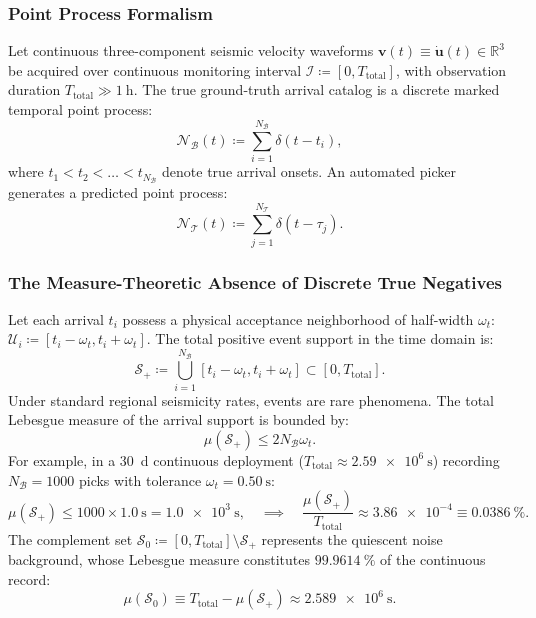 \subsubsection*{Point Process Formalism}
Let continuous three-component seismic velocity waveforms
$\mathbf{v}(t) \equiv \dot{\mathbf{u}}(t) \in \mathbb{R}^3$
be acquired over continuous monitoring interval $\mathcal{I}
\coloneqq [0, T_{\mathrm{total}}]$,
with observation duration $T_{\mathrm{total}} \gg \qty{1}{\hour}$.
The true ground-truth arrival catalog is a discrete marked temporal
point process:
\begin{equation}
  \mathcal{N}_{\mathcal{B}}(t) \coloneqq
  \sum_{i=1}^{N_{\mathcal{B}}} \delta(t - t_i),
  \label{eq:supp_bulletin_process}
\end{equation}
where $t_1 < t_2 < \dots < t_{N_{\mathcal{B}}}$ denote true arrival onsets.
An automated picker generates a predicted point process:
\begin{equation}
  \mathcal{N}_{\mathcal{T}}(t) \coloneqq
  \sum_{j=1}^{N_{\mathcal{T}}} \delta(t - \tau_j).
  \label{eq:supp_target_process}
\end{equation}

\subsubsection*{The Measure-Theoretic Absence of Discrete True Negatives}
Let each arrival $t_i$ possess a physical acceptance neighborhood of
half-width $\omega_t$:
$\mathcal{U}_i \coloneqq [t_i - \omega_t, t_i + \omega_t]$.
The total positive event support in the time domain is:
\begin{equation}
  \mathcal{S}_{+} \coloneqq \bigcup_{i=1}^{N_{\mathcal{B}}} [t_i -
  \omega_t, t_i + \omega_t] \subset [0, T_{\mathrm{total}}].
  \label{eq:supp_positive_support}
\end{equation}
Under standard regional seismicity rates, events are rare phenomena.
The total Lebesgue
measure of the arrival support is bounded by:
\begin{equation}
  \mu(\mathcal{S}_{+}) \le 2 N_{\mathcal{B}} \omega_t.
  \label{eq:supp_lebesgue_pos}
\end{equation}
For example, in a \qty{30}{\day} continuous deployment
($T_{\mathrm{total}} \approx \qty{2.59e6}{\second}$)
recording $N_{\mathcal{B}} = \num{1000}$ picks with tolerance
$\omega_t = \qty{0.50}{\second}$:
\begin{equation}
  \mu(\mathcal{S}_{+}) \le \num{1000} \times \qty{1.0}{\second} =
  \qty{1.0e3}{\second},
  \quad \implies \quad
  \frac{\mu(\mathcal{S}_{+})}{T_{\mathrm{total}}} \approx
  \num{3.86e-4} \equiv \qty{0.0386}{\percent}.
\end{equation}
The complement set $\mathcal{S}_0 \coloneqq [0, T_{\mathrm{total}}]
\setminus \mathcal{S}_{+}$
represents the quiescent noise background, whose Lebesgue measure constitutes
$\qty{99.9614}{\percent}$ of the continuous record:
\begin{equation}
  \mu(\mathcal{S}_0) \equiv T_{\mathrm{total}} -
  \mu(\mathcal{S}_{+}) \approx \qty{2.589e6}{\second}.
  \label{eq:supp_lebesgue_zero}
\end{equation}

